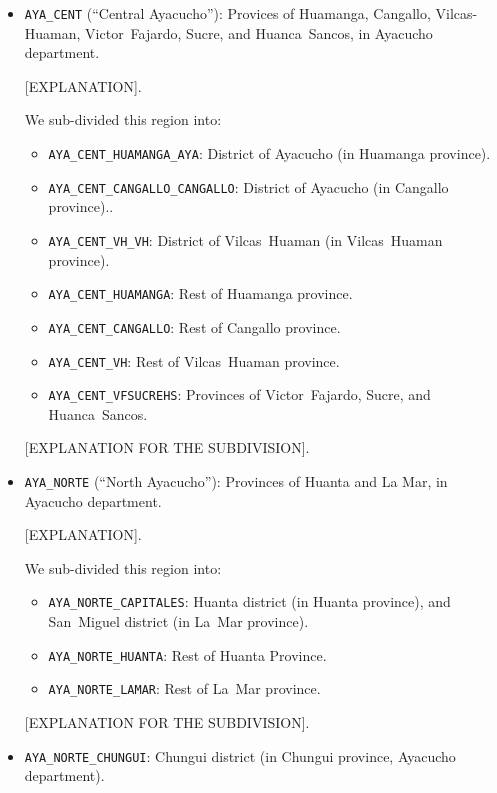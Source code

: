 \documentclass[class=article, crop=false]{standalone}
\begin{document}
\begin{itemize}
  \item \texttt{AYA\_CENT} (``Central Ayacucho''): Provices of Huamanga, Cangallo, Vilcas-Huaman, Victor~Fajardo, Sucre, and Huanca~Sancos, in Ayacucho department. 

    [EXPLANATION].

    We sub-divided this region into: 
    \begin{itemize} 
      \item \texttt{AYA\_CENT\_HUAMANGA\_AYA}:       District of Ayacucho (in Huamanga province).
      \item \texttt{AYA\_CENT\_CANGALLO\_CANGALLO}:  District of Ayacucho (in Cangallo province)..
      \item \texttt{AYA\_CENT\_VH\_VH}:              District of Vilcas~Huaman (in Vilcas~Huaman province).
      \item \texttt{AYA\_CENT\_HUAMANGA}: Rest of Huamanga province.
      \item \texttt{AYA\_CENT\_CANGALLO}: Rest of Cangallo province.
      \item \texttt{AYA\_CENT\_VH}: Rest of Vilcas~Huaman province.
      \item \texttt{AYA\_CENT\_VFSUCREHS}: Provinces of Victor~Fajardo, Sucre, and Huanca~Sancos.
    \end{itemize}

    [EXPLANATION FOR THE SUBDIVISION].


  \item \texttt{AYA\_NORTE} (``North Ayacucho''): Provinces of Huanta and La Mar, in Ayacucho department.

    [EXPLANATION].

    We sub-divided this region into:
    \begin{itemize}
      \item \texttt{AYA\_NORTE\_CAPITALES}: Huanta district (in Huanta province), and San~Miguel district (in La~Mar province).
      \item \texttt{AYA\_NORTE\_HUANTA}: Rest of Huanta Province. 
      \item \texttt{AYA\_NORTE\_LAMAR}: Rest of La~Mar province.
    \end{itemize}

    [EXPLANATION FOR THE SUBDIVISION].


  \item \texttt{AYA\_NORTE\_CHUNGUI}: Chungui district (in Chungui province, Ayacucho department).


\end{itemize}
\end{document}
